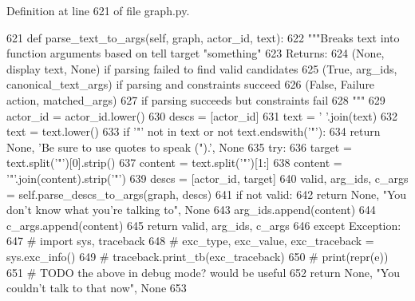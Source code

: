 Definition at line 621 of file graph.\+py.


\begin{DoxyCode}
621     \textcolor{keyword}{def }parse\_text\_to\_args(self, graph, actor\_id, text):
622         \textcolor{stringliteral}{"""Breaks text into function arguments based on tell target "something"}
623 \textcolor{stringliteral}{        Returns:}
624 \textcolor{stringliteral}{        (None, display text, None) if parsing failed to find valid candidates}
625 \textcolor{stringliteral}{        (True, arg\_ids, canonical\_text\_args) if parsing and constraints succeed}
626 \textcolor{stringliteral}{        (False, Failure action, matched\_args)}
627 \textcolor{stringliteral}{                if parsing succeeds but constraints fail}
628 \textcolor{stringliteral}{        """}
629         actor\_id = actor\_id.lower()
630         descs = [actor\_id]
631         text = \textcolor{stringliteral}{' '}.join(text)
632         text = text.lower()
633         \textcolor{keywordflow}{if} \textcolor{stringliteral}{'"'} \textcolor{keywordflow}{not} \textcolor{keywordflow}{in} text \textcolor{keywordflow}{or} \textcolor{keywordflow}{not} text.endswith(\textcolor{stringliteral}{'"'}):
634             \textcolor{keywordflow}{return} \textcolor{keywordtype}{None}, \textcolor{stringliteral}{'Be sure to use quotes to speak (").'}, \textcolor{keywordtype}{None}
635         \textcolor{keywordflow}{try}:
636             target = text.split(\textcolor{stringliteral}{'"'})[0].strip()
637             content = text.split(\textcolor{stringliteral}{'"'})[1:]
638             content = \textcolor{stringliteral}{'"'}.join(content).strip(\textcolor{stringliteral}{'"'})
639             descs = [actor\_id, target]
640             valid, arg\_ids, c\_args = self.parse\_descs\_to\_args(graph, descs)
641             \textcolor{keywordflow}{if} \textcolor{keywordflow}{not} valid:
642                 \textcolor{keywordflow}{return} \textcolor{keywordtype}{None}, \textcolor{stringliteral}{"You don't know what you're talking to"}, \textcolor{keywordtype}{None}
643             arg\_ids.append(content)
644             c\_args.append(content)
645             \textcolor{keywordflow}{return} valid, arg\_ids, c\_args
646         \textcolor{keywordflow}{except} Exception:
647             \textcolor{comment}{# import sys, traceback}
648             \textcolor{comment}{# exc\_type, exc\_value, exc\_traceback = sys.exc\_info()}
649             \textcolor{comment}{# traceback.print\_tb(exc\_traceback)}
650             \textcolor{comment}{# print(repr(e))}
651             \textcolor{comment}{# TODO the above in debug mode? would be useful}
652             \textcolor{keywordflow}{return} \textcolor{keywordtype}{None}, \textcolor{stringliteral}{"You couldn't talk to that now"}, \textcolor{keywordtype}{None}
653 
\end{DoxyCode}
\mbox{\label{classlight__chats_1_1graph_1_1TellFunction_a86e8534217b3d10cb4daf5cc080d624e}} 
